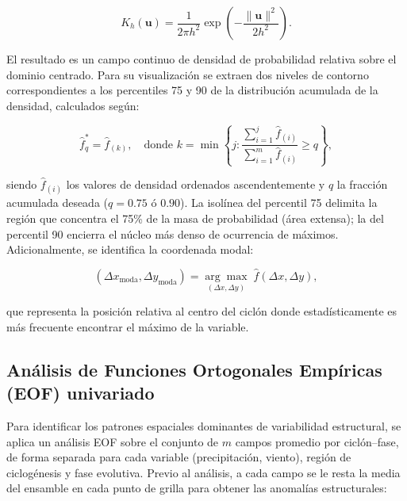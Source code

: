 \begin{equation}
K_h(\mathbf{u}) = \frac{1}{2\pi h^2} \exp\!\left(-\frac{\|\mathbf{u}\|^2}{2h^2}\right).
\label{eq:gauss_kernel_2d_simple}
\end{equation}

El resultado es un campo continuo de densidad de probabilidad relativa sobre el dominio centrado. Para su visualización se extraen dos niveles de contorno correspondientes a los percentiles 75 y 90 de la distribución acumulada de la densidad, calculados según:

\begin{equation}
    \hat{f}^*_q = \hat{f}_{(k)}, \quad \text{donde } k = \min\!\left\{j : \frac{\sum_{i=1}^{j}\hat{f}_{(i)}}{\sum_{i=1}^{m}\hat{f}_{(i)}} \geq q \right\},
\label{eq:nivel_contorno_kde}
\end{equation}

siendo $\hat{f}_{(i)}$ los valores de densidad ordenados ascendentemente y $q$ la fracción acumulada deseada ($q = 0.75$ ó $0.90$). La isolínea del percentil 75 delimita la región que concentra el 75\% de la masa de probabilidad (área extensa); la del percentil 90 encierra el núcleo más denso de ocurrencia de máximos. Adicionalmente, se identifica la coordenada modal:

\begin{equation}
    (\Delta x_{\text{moda}}, \Delta y_{\text{moda}}) = \underset{(\Delta x, \Delta y)}{\arg\max}\; \hat{f}(\Delta x, \Delta y),
\label{eq:moda_kde}
\end{equation}

que representa la posición relativa al centro del ciclón donde estadísticamente es más frecuente encontrar el máximo de la variable.

\subsection{Análisis de Funciones Ortogonales Empíricas (EOF) univariado}\label{subsec:eof_univariado}

Para identificar los patrones espaciales dominantes de variabilidad estructural, se aplica un análisis EOF sobre el conjunto de $m$ campos promedio por ciclón--fase, de forma separada para cada variable (precipitación, viento), región de ciclogénesis y fase evolutiva. Previo al análisis, a cada campo se le resta la media del ensamble en cada punto de grilla para obtener las anomalías estructurales:

